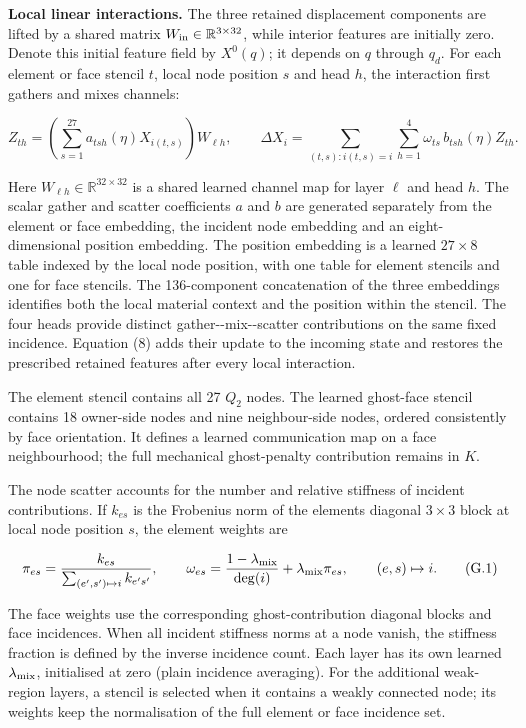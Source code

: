 \documentclass[preprint,12pt,authoryear]{elsarticle}
\begin{document}
\textbf{Local linear interactions.} The three retained displacement components are lifted by a shared matrix \(W_{\rm in}\in\mathbb R^{3\times32}\), while interior features are initially zero. Denote this initial feature field by \(X^0(q)\); it depends on \(q\) through \(q_d\). For each element or face stencil \(t\), local node position \(s\) and head \(h\), the interaction first gathers and mixes channels:

\[
Z_{th}=\left(\sum_{s=1}^{27}a_{tsh}(\eta)X_{i(t,s)}\right)W_{\ell h},
\qquad
\Delta X_i=\sum_{(t,s):i(t,s)=i}\sum_{h=1}^{4}
\omega_{ts}\,b_{tsh}(\eta)Z_{th}.
\]

Here \(W_{\ell h}\in\mathbb R^{32\times32}\) is a shared learned channel map for layer \(\ell\) and head \(h\). The scalar gather and scatter coefficients \(a\) and \(b\) are generated separately from the element or face embedding, the incident node embedding and an eight-dimensional position embedding. The position embedding is a learned \(27\times8\) table indexed by the local node position, with one table for element stencils and one for face stencils. The 136-component concatenation of the three embeddings identifies both the local material context and the position within the stencil. The four heads provide distinct gather-\/-mix-\/-scatter contributions on the same fixed incidence. Equation (8) adds their update to the incoming state and restores the prescribed retained features after every local interaction.

The element stencil contains all 27 \(Q_2\) nodes. The learned ghost-face stencil contains 18 owner-side nodes and nine neighbour-side nodes, ordered consistently by face orientation. It defines a learned communication map on a face neighbourhood; the full mechanical ghost-penalty contribution remains in \(K\).

The node scatter accounts for the number and relative stiffness of incident contributions. If \(k_{es}\) is the Frobenius norm of the element\textquotesingle s diagonal \(3\times3\) block at local node position \(s\), the element weights are

\[
\pi_{es}=\frac{k_{es}}{\sum_{(e',s')\mapsto i}k_{e's'}},
\qquad
\omega_{es}=\frac{1-\lambda_{\rm mix}}{\deg(i)}
 +\lambda_{\rm mix}\pi_{es},\qquad(e,s)\mapsto i.
\tag{G.1}
\]

The face weights use the corresponding ghost-contribution diagonal blocks and face incidences. When all incident stiffness norms at a node vanish, the stiffness fraction is defined by the inverse incidence count. Each layer has its own learned \(\lambda_{\rm mix}\), initialised at zero (plain incidence averaging). For the additional weak-region layers, a stencil is selected when it contains a weakly connected node; its weights keep the normalisation of the full element or face incidence set.
\end{document}

